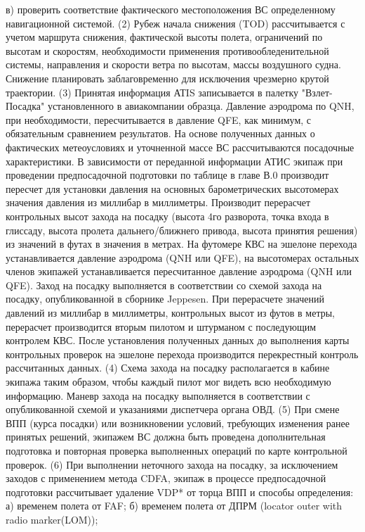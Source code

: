 в)	проверить соответствие фактического местоположения ВС определенному навигационной системой.
(2) Рубеж начала снижения (TOD) рассчитывается с учетом маршрута снижения, фактической высоты полета, ограничений по высотам и скоростям, необходимости применения противообледенительной системы, направления и скорости ветра по высотам, массы воздушного судна. Снижение планировать заблаговременно для исключения чрезмерно крутой траектории. 
(3) Принятая информация АТIS записывается в палетку "Взлет-Посадка" установленного в авиакомпании образца. 
Давление аэродрома по QNH, при необходимости, пересчитывается в давление QFE, как минимум, с обязательным сравнением результатов. На основе полученных данных о фактических метеоусловиях и уточненной массе ВС рассчитываются посадочные характеристики.
В зависимости от переданной информации АТИС экипаж при проведении предпосадочной подготовки по таблице в главе В.0 производит пересчет для установки давления на основных барометрических высотомерах значения давления из миллибар в миллиметры. Производит перерасчет контрольных высот захода на посадку (высота 4го разворота, точка входа в глиссаду, высота пролета дальнего/ближнего привода, высота принятия решения) из значений в футах в значения в метрах. 
На футомере КВС на эшелоне перехода устанавливается давление аэродрома (QNH или QFE), на высотомерах остальных членов экипажей устанавливается пересчитанное давление аэродрома (QNH или QFE). Заход на посадку выполняется в соответствии со схемой захода на посадку, опубликованной в сборнике Jeppesen.
При перерасчете значений давлений из миллибар в миллиметры, контрольных высот из футов в метры, перерасчет производится вторым пилотом и штурманом с последующим контролем КВС. 
После установления полученных данных до выполнения карты контрольных проверок на эшелоне перехода производится перекрестный контроль рассчитанных данных.
(4) Схема захода на посадку располагается в кабине экипажа таким образом, чтобы каждый пилот мог видеть всю необходимую информацию. Маневр захода на посадку выполняется в соответствии с опубликованной схемой и указаниями диспетчера органа ОВД.
(5) При смене ВПП (курса посадки) или возникновении условий, требующих изменения ранее принятых решений, экипажем ВС должна быть проведена дополнительная подготовка и повторная проверка выполненных операций по карте контрольной проверок. 
(6) При выполнении неточного захода на посадку, за исключением заходов с применением метода CDFA, экипаж в процессе предпосадочной подготовки рассчитывает удаление VDP* от торца ВПП и способы определения:
а)	временем полета от FAF;
б)	временем полета от ДПРМ (locator outer with radio marker(LOM));
